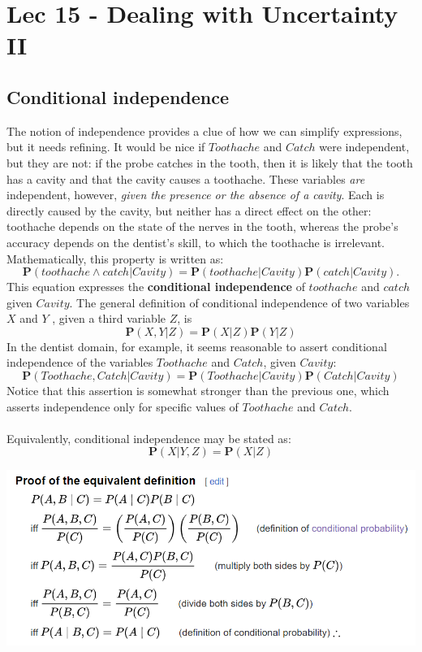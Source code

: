 \chapter{Lec 15 - Dealing with Uncertainty II}

\section{Conditional independence}
The notion of independence provides a clue of how we can simplify expressions, but it needs refining. It would be nice if $Toothache$ and $Catch$ were independent, but they are not: if the probe catches in the tooth, then it is likely that the tooth
has a cavity and that the cavity causes a toothache. These variables \textit{are} independent, however, \textit{given the presence or the absence of a cavity}.  Each is directly caused by the cavity, but neither has a direct effect on the other: toothache depends on the state of the nerves in the tooth, whereas the probe’s accuracy depends on the dentist’s skill, to which the toothache is irrelevant. Mathematically, this property is written as:
\[\textbf{P}(toothache \land catch | Cavity) = \textbf{P}(toothache | Cavity)\textbf{P}(catch | Cavity) .\]
This equation expresses the \textbf{conditional independence} of $toothache$ and $catch$ given $Cavity$.
The general definition of conditional independence of two variables $X$ and $Y$ , given a third variable $Z$, is
\[\textbf{P}(X, Y | Z) = \textbf{P}(X | Z)\textbf{P}(Y | Z)\]
In the dentist domain, for example, it seems reasonable to assert conditional independence of the variables $Toothache$ and $Catch$, given $Cavity$:
\[\textbf{P}(Toothache, Catch | Cavity) = \textbf{P}(Toothache | Cavity)\textbf{P}(Catch | Cavity)\]
Notice that this assertion is somewhat stronger than the previous one, which asserts independence only for specific values of $Toothache$ and $Catch$.\\\\
Equivalently, conditional independence may be stated as:
\[\textbf{P}(X | Y,Z) = \textbf{P}(X |Z)\]
\begin{center}
    \includegraphics[scale=0.8]{images/proof cond prob.png}
\end{center}
